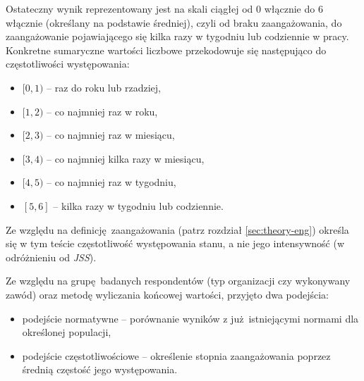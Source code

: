 Ostateczny wynik reprezentowany jest na skali ciągłej od 0 włącznie do 6 włącznie (określany na podstawie średniej), czyli od braku zaangażowania, do zaangażowanie pojawiającego się kilka razy w tygodniu lub codziennie w pracy. Konkretne sumaryczne wartości liczbowe przekodowuje się następująco do częstotliwości występowania: 
\begin{itemize}
  \item $[0, 1)$ -- raz do roku lub rzadziej,
  \item $[1, 2)$ -- co najmniej raz w roku,
  \item $[2, 3)$ -- co najmniej raz w miesiącu,
  \item $[3, 4)$ -- co najmniej kilka razy w miesiącu,
  \item $[4, 5)$ -- co najmniej raz w tygodniu,
  \item $[5, 6]$ -- kilka razy w tygodniu lub codziennie.
\end{itemize}

Ze względu na definicję zaangażowania (patrz rozdział \ref{sec:theory-eng}) określa się w tym teście częstotliwość występowania stanu, a nie jego intensywność (w odróżnieniu od \emph{JSS}).

Ze względu na grupę badanych respondentów (typ organizacji czy wykonywany zawód) oraz metodę wyliczania końcowej wartości, przyjęto dwa podejścia:
\begin{itemize}
\item podejście normatywne -- porównanie wyników z już istniejącymi normami dla określonej populacji,
\item podejście częstotliwościowe -- określenie stopnia zaangażowania poprzez średnią częstość jego występowania.
\end{itemize}
